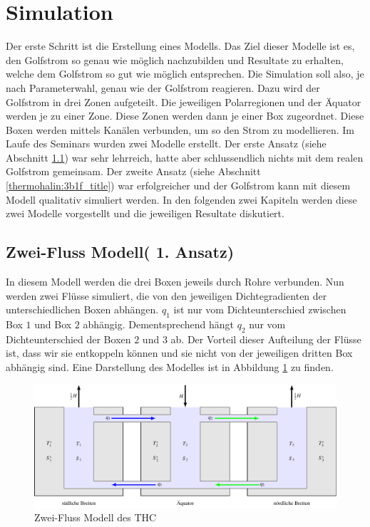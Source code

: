 \section{Simulation}

Der erste Schritt ist die Erstellung eines Modells.
Das Ziel dieser Modelle ist es, den Golfstrom so genau wie möglich nachzubilden und Resultate zu erhalten, welche dem Golfstrom so gut wie möglich entsprechen. Die Simulation soll also, je nach Parameterwahl, genau wie der Golfstrom reagieren.
Dazu wird der Golfstrom in drei Zonen aufgeteilt. Die jeweiligen Polarregionen und der Äquator werden je zu einer Zone. Diese Zonen werden dann je einer Box zugeordnet. Diese Boxen werden mittels Kanälen verbunden, um so den Strom zu modellieren. 
Im Laufe des Seminars wurden zwei Modelle erstellt. Der erste Ansatz (siehe Abschnitt \ref{thermohalin:3b2f_title}) war sehr lehrreich, hatte aber schlussendlich nichts mit dem realen Golfstrom gemeinsam. Der zweite Ansatz (siehe Abschnitt \ref{thermohalin:3b1f_title}) war erfolgreicher und der Golfstrom kann mit diesem Modell qualitativ simuliert werden.
In den folgenden zwei Kapiteln werden diese zwei Modelle vorgestellt und die jeweiligen Resultate diskutiert.

\subsection{Zwei-Fluss Modell( 1. Ansatz)}\label{thermohalin:3b2f_title}

In diesem Modell werden die drei Boxen jeweils durch Rohre verbunden. Nun werden zwei Flüsse simuliert, die von den jeweiligen Dichtegradienten der unterschiedlichen Boxen abhängen. $q_1$ ist nur vom Dichteunterschied zwischen Box $1$ und Box $2$ abhängig. Dementsprechend hängt $q_2$ nur vom Dichteunterschied der Boxen $2$ und $3$ ab.
Der Vorteil dieser Aufteilung der Flüsse ist, dass wir sie entkoppeln können und sie nicht von der jeweiligen dritten Box abhängig sind.
Eine Darstellung des Modelles ist in Abbildung \ref{thermohalin:3b2f} zu finden.

\begin{figure}
	\centering
	\includegraphics[width=14cm]{thermohalin/tikz/3b2f.pdf}
	\caption{Zwei-Fluss Modell des THC}
		\label{thermohalin:3b2f}
\end{figure}

